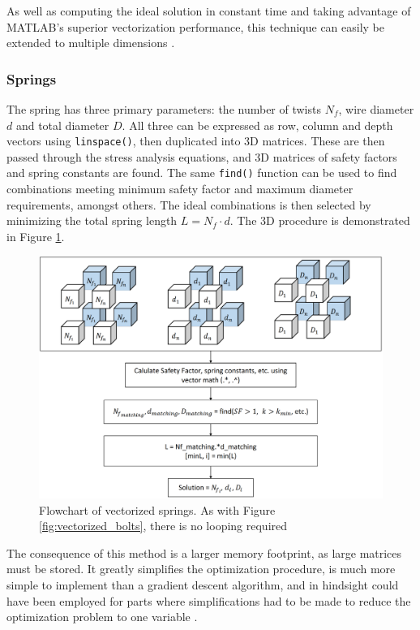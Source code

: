 As well as computing the ideal solution in constant time and taking advantage of MATLAB's superior vectorization performance, this technique can easily be extended to multiple dimensions \cite{mathworks_vectorization_2019}.

\subsubsection{Springs} \label{app_ssub:vectorization_spring}

The spring has three primary parameters: the number of twists $N_f$, wire diameter $d$ and total diameter $D$.
All three can be expressed as row, column and depth vectors using \texttt{linspace()}, then duplicated into 3D matrices.
These are then passed through the stress analysis equations, and 3D matrices of safety factors and spring constants are found.
The same \texttt{find()} function can be used to find combinations meeting minimum safety factor and maximum diameter requirements, amongst others.
The ideal combinations is then selected by minimizing the total spring length $L = N_f \cdot d$.
The 3D procedure is demonstrated in Figure \ref{fig:vectorized_springs}.

\begin{figure}[H]
    \centering
    \includegraphics[width=\textwidth]{3_Parametrization/img/VectorizedSprings.png}
    \caption{Flowchart of vectorized springs. As with Figure \ref{fig:vectorized_bolts}, there is no looping required}
    \label{fig:vectorized_springs}
\end{figure}{}

The consequence of this method is a larger memory footprint, as large matrices must be stored.
It greatly simplifies the optimization procedure, is much more simple to implement than a gradient descent algorithm, and in hindsight could have been employed for parts where simplifications had to be made to reduce the optimization problem to one variable \cite{kathuria_intro_2018}.